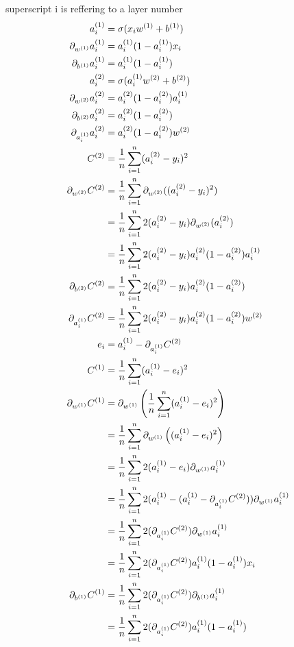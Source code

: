 \documentclass{article}
\begin{document}
superscript i is reffering to a layer number
\begin{align}
    a_i\s[1] &= \sigma(x_iw\s[1] + b\s[1]) \\
    \pd[{w\s[1]}]a_i\s[1] &= a_i\s[1](1 - a_i\s[1])x_i \\
    \pd[{b\s[1]}]a_i\s[1] &= a_i\s[1](1 - a_i\s[1]) \\
    a_i\s[2] &= \sigma(a_i\s[1]w\s[2] + b\s[2]) \\
    \pd[{w\s[2]}]a_i\s[2] &= a_i\s[2](1 - a_i\s[2])a_i\s[1] \\
    \pd[{b\s[2]}]a_i\s[2] &= a_i\s[2](1 - a_i\s[2]) \\
    \pd[{a_i\s[1]}]a_i\s[2] &= a_i\s[2](1 - a_i\s[2])w\s[2] \\
    C\s[2] &= \avgsum[i, n] (a_i\s[2] - y_i)^2 \\
    \pd[{w\s[2]}] C\s[2]
        &= \avgsum[i, n] \pd[{w\s[2]}]((a_i\s[2] - y_i)^2) \\
        &= \avgsum[i, n] 2(a_i\s[2] - y_i)\pd[{w\s[2]}](a_i\s[2]) \\
        &= \avgsum[i, n] 2(a_i\s[2] - y_i)a_i\s[2](1 - a_i\s[2])a_i\s[1] \\
    \pd[{b\s[2]}] C\s[2]
        &= \avgsum[i, n] 2(a_i\s[2] - y_i)a_i\s[2](1 - a_i\s[2]) \\
    \pd[{a_i\s[1]}] C\s[2]
        &= \avgsum[i, n] 2(a_i\s[2] - y_i)a_i\s[2](1 - a_i\s[2])w\s[2] \\
    e_i
        &= a_i\s[1] - \pd[{a_i\s[1]}]C\s[2] \\
    C\s[1]
        &= \avgsum[i, n] (a_i\s[1] - e_i)^2 \\
    \pd[{w\s[1]}]C\s[1]
        &= \pd[{w\s[1]}]\left(\avgsum[i, n] (a_i\s[1] - e_i)^2\right) \\
        &= \avgsum[i, n] \pd[{w\s[1]}]\left((a_i\s[1] - e_i)^2\right) \\
        &= \avgsum[i, n] 2(a_i\s[1] - e_i) \pd[{w\s[1]}]a_i\s[1] \\
        &= \avgsum[i, n] 2(a_i\s[1] -(a_i\s[1] - \pd[{a_i\s[1]}]C\s[2])) \pd[{w\s[1]}]a_i\s[1] \\
        &= \avgsum[i, n] 2(\pd[{a_i\s[1]}]C\s[2]) \pd[{w\s[1]}]a_i\s[1] \\
        &= \avgsum[i, n] 2(\pd[{a_i\s[1]}]C\s[2]) a_i\s[1](1 - a_i\s[1])x_i \\
    \pd[{b\s[1]}]C\s[1]
        &= \avgsum[i, n] 2(\pd[{a_i\s[1]}]C\s[2]) \pd[{b\s[1]}]a_i\s[1] \\
        &= \avgsum[i, n] 2(\pd[{a_i\s[1]}]C\s[2]) a_i\s[1](1 - a_i\s[1])
\end{align}
\end{document}
